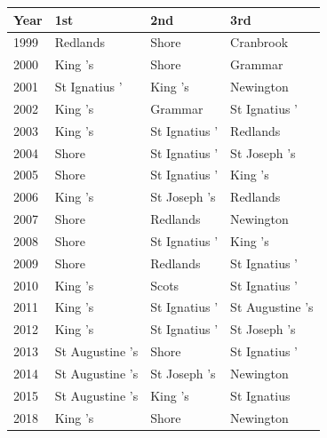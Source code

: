 \documentclass{article}
\begin{document}
\begin{tabular}{llll}
\toprule
Year & 1st & 2nd & 3rd \\
\midrule
1999 & Redlands & Shore & Cranbrook \\
2000 & King 's & Shore & Grammar \\
2001 & St Ignatius ' & King 's & Newington \\
2002 & King 's & Grammar & St Ignatius ' \\
2003 & King 's & St Ignatius ' & Redlands \\
2004 & Shore & St Ignatius ' & St Joseph 's \\
2005 & Shore & St Ignatius ' & King 's \\
2006 & King 's & St Joseph 's & Redlands \\
2007 & Shore & Redlands & Newington \\
2008 & Shore & St Ignatius ' & King 's \\
2009 & Shore & Redlands & St Ignatius ' \\
2010 & King 's & Scots & St Ignatius ' \\
2011 & King 's & St Ignatius ' & St Augustine 's \\
2012 & King 's & St Ignatius ' & St Joseph 's \\
2013 & St Augustine 's & Shore & St Ignatius ' \\
2014 & St Augustine 's & St Joseph 's & Newington \\
2015 & St Augustine 's & King 's & St Ignatius \\
2018 & King 's & Shore & Newington \\
\bottomrule
\end{tabular}
\end{document}
